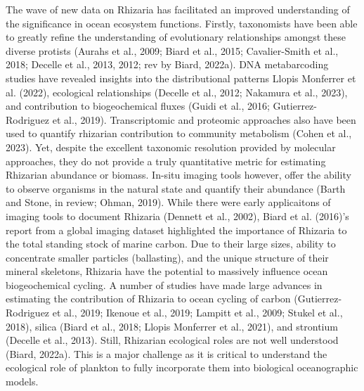 \documentclass[
]{article}
\begin{document}
The wave of new data on Rhizaria has facilitated an improved
understanding of the significance in ocean ecosystem functions. Firstly,
taxonomists have been able to greatly refine the understanding of
evolutionary relationships amongst these diverse protists (Aurahs et
al., 2009; Biard et al., 2015; Cavalier-Smith et al., 2018; Decelle et
al., 2013, 2012; rev by Biard, 2022a). DNA metabarcoding studies have
revealed insights into the distributional patterns Llopis Monferrer et
al. (2022), ecological relationships (Decelle et al., 2012; Nakamura et
al., 2023), and contribution to biogeochemical fluxes (Guidi et al.,
2016; Gutierrez-Rodriguez et al., 2019). Transcriptomic and proteomic
approaches also have been used to quantify rhizarian contribution to
community metabolism (Cohen et al., 2023). Yet, despite the excellent
taxonomic resolution provided by molecular approaches, they do not
provide a truly quantitative metric for estimating Rhizarian abundance
or biomass. In-situ imaging tools however, offer the ability to observe
organisms in the natural state and quantify their abundance (Barth and
Stone, in review; Ohman, 2019). While there were early applicaitons of
imaging tools to document Rhizaria (Dennett et al., 2002), Biard et al.
(2016)'s report from a global imaging dataset highlighted the importance
of Rhizaria to the total standing stock of marine carbon. Due to their
large sizes, ability to concentrate smaller particles (ballasting), and
the unique structure of their mineral skeletons, Rhizaria have the
potential to massively influence ocean biogeochemical cycling. A number
of studies have made large advances in estimating the contribution of
Rhizaria to ocean cycling of carbon (Gutierrez-Rodriguez et al., 2019;
Ikenoue et al., 2019; Lampitt et al., 2009; Stukel et al., 2018), silica
(Biard et al., 2018; Llopis Monferrer et al., 2021), and strontium
(Decelle et al., 2013). Still, Rhizarian ecological roles are not well
understood (Biard, 2022a). This is a major challenge as it is critical
to understand the ecological role of plankton to fully incorporate them
into biological oceanographic models.
\end{document}
